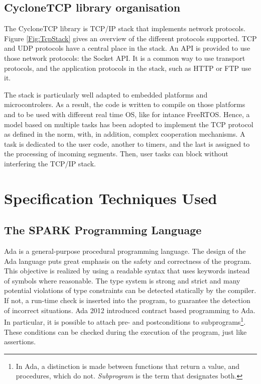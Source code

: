 \documentclass[runningheads]{llncs}
\begin{document}
\subsection{CycloneTCP library organisation}

    

    The CycloneTCP library is TCP/IP stack that implements network protocols.
    Figure \ref{Fig:TcpStack} gives an overview of the different protocols supported. TCP and UDP protocols have a central place
    in the stack. An API is provided to use those network protocols: the Socket API. It is a common way to use transport protocols,
    and the application protocols in the stack, such as HTTP or FTP use it.

    The stack is particularly well adapted to embedded platforms and microcontrolers. As a result, the code is written
    to compile on those platforms and to be used with different real time OS, like for intance FreeRTOS.
    Hence, a model based on multiple tasks has been adopted to implement the TCP protocol as defined in the norm, with,
    in addition, complex cooperation mechanisms. A task is dedicated to the user code, another to timers, and the last is
    assigned to the processing of incoming segments. Then, user tasks can block without interfering the TCP/IP stack.

\section{Specification Techniques Used}
\label{sec:spec}

\subsection{The SPARK Programming Language}

Ada is a general-purpose procedural programming language. The design of the Ada
language puts great emphasis on the safety and correctness of the program. This
objective is realized by using a readable syntax that uses keywords instead of
symbols where reasonable. The type system is strong and strict and many
potential violations of type constraints can be detected statically by the
compiler. If not, a run-time check is inserted into the program, to guarantee
the detection of incorrect situations. Ada 2012 introduced contract based
programming to Ada. In particular, it is possible to attach pre- and
postconditions to subprograms\footnote{In Ada, a distinction is made between
  functions that return a value, and procedures, which do
  not. \emph{Subprogram} is the term that designates both.}.  These conditions
can be checked during the execution of the program, just like assertions.
\end{document}
